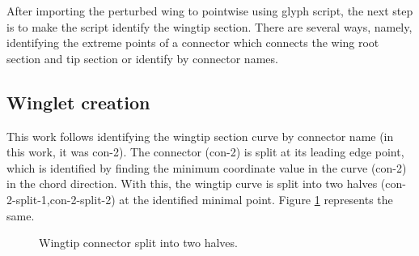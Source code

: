 After importing the perturbed wing to pointwise using glyph script, the next step is to make the script identify the wingtip section. There are several ways, namely, identifying the extreme points of a connector which connects the wing root section and tip section or identify by connector names. 

\subsection{Winglet creation}
This work follows identifying the wingtip section curve by connector name (in this work, it was con-2). The connector (con-2) is split at its leading edge point, which is identified by finding the minimum coordinate value in the curve (con-2) in the chord direction. With this, the wingtip curve is split into two halves (con-2-split-1,con-2-split-2) at the identified minimal point. Figure \ref{connector_split} represents the same. 

\begin{figure}[!htbp]
    \centering
    \caption{Wingtip connector split into two halves.}
    \label{connector_split}
\end{figure}

